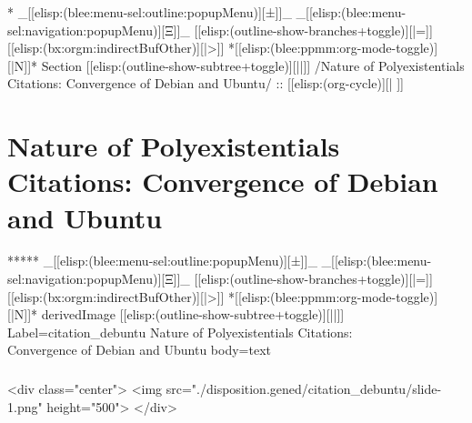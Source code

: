 \begin{whenOrg}
\begin{verblatex}
\begin{frame}[fragile,plain,label=JustDebian]
{}
\end{frame}
\end{verblatex}


\begin{whenOrg}
*  _[[elisp:(blee:menu-sel:outline:popupMenu)][±]]_ _[[elisp:(blee:menu-sel:navigation:popupMenu)][Ξ]]_ [[elisp:(outline-show-branches+toggle)][|=]] [[elisp:(bx:orgm:indirectBufOther)][|>]] *[[elisp:(blee:ppmm:org-mode-toggle)][|N]]*  Section    [[elisp:(outline-show-subtree+toggle)][||]]   /Nature of Polyexistentials Citations: Convergence of Debian and Ubuntu/ ::  [[elisp:(org-cycle)][| ]]
\end{whenOrg}

\section{Nature of Polyexistentials Citations: Convergence of Debian and Ubuntu}


\begin{whenOrg}
*****  _[[elisp:(blee:menu-sel:outline:popupMenu)][±]]_ _[[elisp:(blee:menu-sel:navigation:popupMenu)][Ξ]]_ [[elisp:(outline-show-branches+toggle)][|=]] [[elisp:(bx:orgm:indirectBufOther)][|>]] *[[elisp:(blee:ppmm:org-mode-toggle)][|N]]*  derivedImage [[elisp:(outline-show-subtree+toggle)][||]] Label=citation_debuntu Nature of Polyexistentials Citations:\\ Convergence of Debian and Ubuntu body=text
\end{whenOrg}

\begin{htmlonly}

\begin{frame}[fragile,plain,label=citation_debuntu]
    \frametitle{}
    \framesubtitle{}
    \begin{rawhtml}
<div class="center">
<img src="./disposition.gened/citation_debuntu/slide-1.png" height="500">
</div>
    \end{rawhtml}
\end{frame}
\end{htmlonly}


\end{whenOrg}
